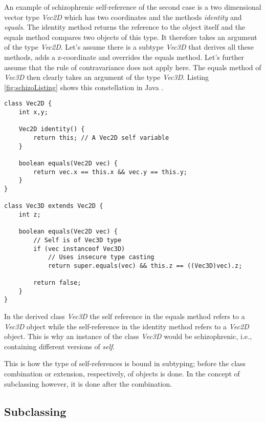 An example of schizophrenic self-reference of the second case is a two
dimensional vector type \emph{Vec2D} which has two coordinates and the
methods \emph{identity} and \emph{equals}. The identity method returns
the reference to the object itself and the equals method compares
two objects of this type. It therefore takes an argument of the type
\emph{Vec2D}. Let's assume there is a subtype \emph{Vec3D} that derives all
these methods, adds a z-coordinate and overrides the equals method. Let's
further assume that the rule of contravariance does not apply here. The
equals method of \emph{Vec3D} then clearly takes an argument of the type
\emph{Vec3D}. Listing \ref{fig:schizoListing} shows this constellation
in Java \cite{simons_theory_2003-2}.

\begin{lstlisting}[float=ht,caption={An example of schizophrenic self-reference.},label={fig:schizoListing}]
class Vec2D {
	int x,y;

	Vec2D identity() {
		return this; // A Vec2D self variable
	}

	boolean equals(Vec2D vec) {
		return vec.x == this.x && vec.y == this.y;
	}
}

class Vec3D extends Vec2D {
	int z;

	boolean equals(Vec2D vec) {
		// Self is of Vec3D type
		if (vec instanceof Vec3D)
			// Uses insecure type casting
			return super.equals(vec) && this.z == ((Vec3D)vec).z;

		return false;
	}
}
\end{lstlisting}

In the derived class \emph{Vec3D} the self reference in the equals
method refers to a \emph{Vec3D} object while the self-reference in the identity method
refers to a \emph{Vec2D} object. This is why an instance of the class
\emph{Vec3D} would be schizophrenic, i.e., containing different versions
of \emph{self}.

This is how the type of self-references is bound in subtyping; before
the class combination or extension, respectively, of objects is done.
In the concept of subclassing however, it is done after the combination.

\subsection{Subclassing}

